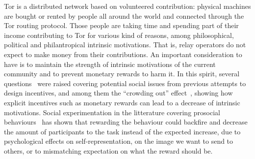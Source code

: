 

Tor is a distributed network based on volunteered contribution: 
physical machines are bought or rented by people all around the 
world and connected through the Tor routing protocol. Those 
people are taking time and spending part of their income 
contributing to Tor for various kind of reasons, among 
philosophical, political and philantropical intrinsic 
motivations. That is, relay operators do not expect to make money 
from their contributions. An important consideration to have is 
to maintain the strength of intrinsic motivations of the current 
community and to prevent monetary rewards to harm it. In this spirit,
several questions~\cite{jansenblogpost} were raised covering 
potential social issues from previous attempts to design incentives, 
and among them the ``crowding out'' effect~\cite{10.1257/jep.25.4.191}, showing how 
explicit incentives such as monetary rewards can lead to a decrease 
of intrinsic motivations. Social experimentation in the litterature 
covering prosocial behaviours~\cite{10.1257/aer.96.5.1652} has shown that rewarding the 
behaviour could backfire and decrease the amount of participants to the 
task instead of the expected increase, due to psychological effects on 
self-representation, on the image we want to send to others, or to 
mismatching expectation on what the reward should be. 

